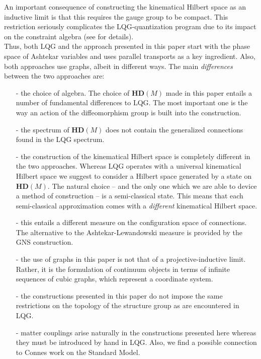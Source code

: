 \documentclass[12pt]{article}
\begin{document}
An important consequence of constructing the kinematical Hilbert space as an inductive limit is that this requires the gauge group to be compact. This restriction seriously complicates the LQG-quantization program due to its impact on the constraint algebra (see \cite{Sahlmann:2010zf} for details).\\


Thus, both LQG and the approach presented in this paper start with the phase space of Ashtekar variables and uses parallel transports as a key ingredient.  Also, both approaches use graphs, albeit in different ways.
The main {\it differences} between the two approaches are:
\begin{itemize}
\item[-]
the choice of algebra. The choice of $\mathbf{HD}(M) $ made in this paper entails a number of fundamental differences to LQG. The most important one is the way an action of the diffeomorphism group is {built into} the construction. %
\item[-]
the spectrum of $\mathbf{HD}(M) $ does not contain the generalized connections found in the LQG spectrum.
\item[-]
the construction of the kinematical Hilbert space is completely different in the two approaches. Whereas LQG operates with a universal kinematical Hilbert space we suggest to consider a Hilbert space generated by a state on $\mathbf{HD}(M) $. The natural choice -- and the only one which we are able to device a method of construction -- is a semi-classical state. This means that each semi-classical approximation comes with a {\it different} kinematical Hilbert space.
\item[-]
this entails a different measure on the configuration space of connections. The alternative to the Ashtekar-Lewandowski measure is provided by the GNS construction.
\item[-]
the use of graphs in this paper is not that of a projective-inductive limit. Rather, it is the formulation of continuum objects in terms of infinite sequences of cubic graphs, which represent a coordinate system. %
\item[-]
the constructions presented in this paper do not impose the same restrictions on the topology of the structure group as are encountered in LQG.
\item[-]
matter couplings arise naturally in the constructions presented here whereas they must be introduced by hand in LQG. Also, we find a possible connection to Connes work on the Standard Model.
\end{itemize}
\end{document}
